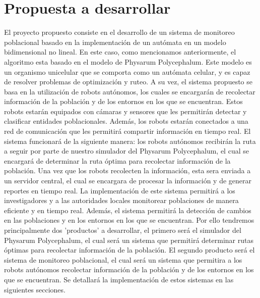\section{Propuesta a desarrollar}
\label{sec:Propuesta a desarrollar}
        El proyecto propuesto consiste en el desarrollo de un sistema de monitoreo poblacional basado en 
            la implementaci\'on de un aut\'omata en un modelo bidimensional no lineal. En este caso, 
            como mencionamos anteriormente, el algoritmo esta basado en el modelo de Physarum Polycephalum.
            Este modelo es un organismo unicelular que se comporta como un aut\'omata celular,
            y es capaz de resolver problemas de optimizaci\'on y ruteo.
        \vskip 0.5cm
        A su vez, el sistema propuesto se basa en la utilizaci\'on de robots aut\'onomos, los cuales 
            se encargar\'an de recolectar informaci\'on de la poblaci\'on y de los entornos en los que 
            se encuentran. Estos robots estar\'an equipados con c\'amaras y sensores que les permitir\'an 
            detectar y clasificar entidades poblacionales. Adem\'as, los robots estar\'an conectados a 
            una red de comunicaci\'on que les permitir\'a compartir informaci\'on en tiempo real.
        \vskip 0.5cm
        El sistema funcionar\'a de la siguiente manera: los robots aut\'onomos recibir\'an la ruta a seguir 
            por parte de nuestro simulador del Physarum Polycephalum, el cual se encargar\'a de determinar
            la ruta \'optima para recolectar informaci\'on de la poblaci\'on. Una vez que los robots
            recolecten la informaci\'on, esta sera enviada a un servidor central, el cual se encargara
            de procesar la informaci\'on y de generar reportes en tiempo real.
        \vskip 0.5cm
        La implementaci\'on de este sistema permitir\'a a los investigadores y a las autoridades locales
            monitorear poblaciones de manera eficiente y en tiempo real. Adem\'as, el sistema permitir\'a
            la detecci\'on de cambios en las poblaciones y en los entornos en los que se encuentran.
        \vskip 0.5cm
        Por ello tendremos principalmente dos 'productos' a desarrollar, el primero ser\'a el simulador
            del Physarum Polycephalum, el cual ser\'a un sistema que permitir\'a determinar rutas \'optimas
            para recolectar informaci\'on de la poblaci\'on. El segundo producto ser\'a el sistema de 
            monitoreo poblacional, el cual ser\'a un sistema que permitira a los robots aut\'onomos 
            recolectar informaci\'on de la poblaci\'on y de los entornos en los que se encuentran.
        \vskip 0.5cm
        Se detallar\'a la implementaci\'on de estos sistemas en las siguientes secciones.
    
    